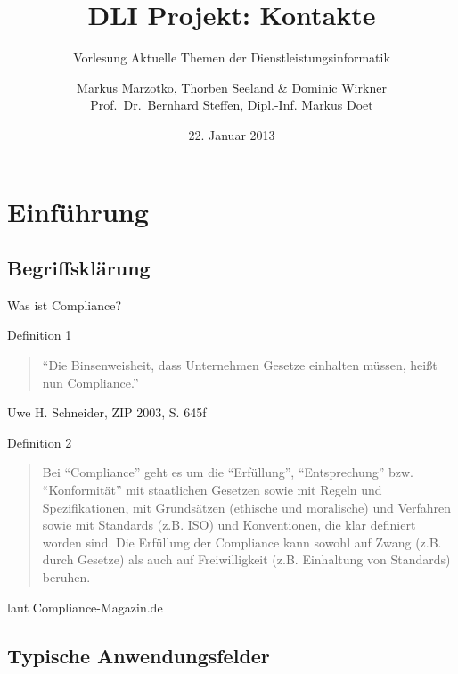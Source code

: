 \documentclass[xcolor=dvipsnames, compress, 10pt]{beamer}
\begin{document}
\title[DLI Projekt: Kontakte]{DLI Projekt: Kontakte}
\subtitle[DLI]{Vorlesung Aktuelle Themen der Dienstleistungsinformatik}
\date{22. Januar 2013}
\author[M.\ Marzotko, T.\ Seeland, D. Wirkner]{Markus Marzotko, Thorben Seeland \& Dominic Wirkner\\ {\scriptsize Prof.\ Dr.\ Bernhard Steffen, Dipl.-Inf. Markus Doet}} 

\nocite{*}

\frame{\titlepage}

\begin{frame}
\tableofcontents
\end{frame}			

\section{Einf\"uhrung}

\subsection*{Begriffskl\"arung}

\begin{frame}{Was ist Compliance?}
\pause
\begin{block}{Definition 1}
		\begin{quote}
			"`Die Binsenweisheit, dass Unternehmen Gesetze einhalten m\"ussen, hei{\ss}t nun
			Compliance."'
		\end{quote}
			Uwe H. Schneider, ZIP 2003, S. 645f
\end{block}
\pause
\begin{block}{Definition 2}
	\begin{quote}
		Bei "`Compliance"' geht es um die "`Erf\"ullung"', "`Entsprechung"' bzw.
		"`Konformit\"at"' mit staatlichen Gesetzen sowie mit Regeln und Spezifikationen,
		mit Grunds\"atzen (ethische und moralische) und Verfahren sowie mit Standards
		(z.B. ISO) und Konventionen, die klar definiert worden sind. Die Erf\"ullung der
		Compliance kann sowohl auf Zwang (z.B. durch Gesetze) als auch auf
		Freiwilligkeit (z.B. Einhaltung von Standards) beruhen.
	\end{quote}
		laut Compliance-Magazin.de
\end{block}
\end{frame}

\subsection*{Typische Anwendungsfelder}
\end{document}
